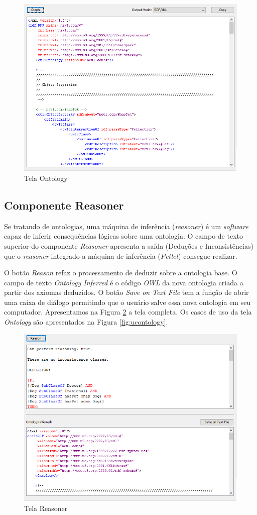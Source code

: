 \documentclass{bcc}
\begin{document}
\begin{figure}[H]
\centering
\includegraphics[width=.8\textwidth]{Figuras/tela_ontology.png}
\caption{Tela Ontology}
\label{fig:telaOntology}
\end{figure}

\subsection{Componente Reasoner}

Se tratando de ontologias, uma máquina de inferência (\textit{reasoner}) é um \textit{software} capaz de inferir consequências lógicas sobre uma ontologia. O campo de texto superior do componente \textit{Reasoner} apresenta a saída (Deduções e Inconsistências) que o \textit{reasoner} integrado a máquina de inferência (\textit{Pellet}) consegue realizar.

O botão \textit{Reason} refaz o processamento de deduzir sobre a ontologia base. O campo de texto \textit{Ontology Inferred} é o código \textit{OWL} da nova ontologia criada a partir dos axiomas deduzidos. O botão \textit{Save on Text File} tem a função de abrir uma caixa de diálogo permitindo que o usuário salve essa nova ontologia em seu computador. Apresentamos na Figura \ref{fig:telaReasoner} a tela completa. Os casos de uso da tela \textit{Ontology} são apresentados na Figura \ref{fig:ucontology}. 

\begin{figure}[H]
\centering
\includegraphics[width=.8\textwidth]{Figuras/tela_reasoner.png}
\caption{Tela Reasoner}
\label{fig:telaReasoner}
\end{figure}
\end{document}
